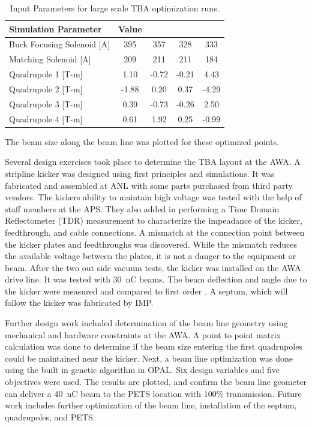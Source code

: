 \begin{table}%
	\begin{center}
		\caption{Input Parameters for large scale TBA optimization runs.}
		\label{tab:designopt}
		\begin{tabular}{lcccc}
			\toprule
			\toprule
			\textbf{Simulation Parameter} 	&  \textbf{Value} \\ 
			\midrule
			{Buck Focusing Solenoid [A]}	&  395   & 357   & 328   & 333  \\
			Matching Solenoid [A]		&  209   & 211   & 211   & 184   \\
			Quadrupole 1 [T-m]			&  1.10  & -0.72 & -0.21 & 4.43  \\ 
			Quadrupole 2 [T-m]			&  -1.88 & 0.20  & 0.37  & -4.29 \\
			Quadrupole 3 [T-m]			&  0.39  & -0.73 & -0.26 & 2.50\\
			Quadrupole 4 [T-m]			&  0.61  & 1.92  & 0.25  & -0.99\\ 
			\bottomrule
		\end{tabular}
	\end{center}
\end{table}
The beam size along the beam line was plotted for these optimized points.
 



Several design exercises took place to determine the TBA layout at the AWA. 
A stripline kicker was designed using first principles and simulations. 
It was fabricated and assembled at ANL with some parts purchased from third party vendors.
The kickers ability to maintain high voltage was tested with the help of staff members at the APS.
They also added in performing a Time Domain Reflectometer (TDR) measurement to characterize 
the impeadance of the kicker, feedthrough, and cable connections. 
A mismatch at the connection point between the kicker plates and feedthroughs was discovered.
While the mismatch reduces the available voltage between the plates, it is not a danger to 
the equipment or beam. After the two out side vacuum tests, the kicker was installed on 
the AWA drive line. It was tested with \SI{30}{nC} beams. 
The beam deflection and angle due to the kicker were measured and 
compared to first order . 
A septum, which will follow the kicker was fabricated by IMP.

Further design work included determination of the beam line geometry
using mechanical and hardware constraints at the AWA. 
A point to point matrix calculation was done to determine if the 
beam size entering the first quadrupoles could be maintained near the kicker.
Next, a beam line optimization was done using the built in genetic algorithm in OPAL.  
Six design variables and five objectives were used. 
The results are plotted, and confirm the beam line geometer can deliver 
a \SI{40}{nC} beam to the PETS location with 100\% transmission.
Future work includes further optimization of the beam line, 
installation of the septum, quadrupoles, and PETS.


 












